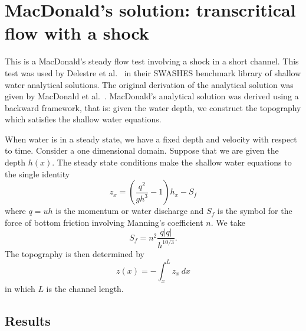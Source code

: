 
\section{MacDonald's solution: transcritical flow with a shock}

This is a MacDonald's steady flow test involving a shock in a short channel. This test was used by Delestre et al.~\cite{Delestre-etal2012} in their \textsc{SWASHES} benchmark library of shallow water analytical solutions. The original derivation of the analytical solution was given by MacDonald et al.~\cite{MBNS1995, MBNS1997}.
MacDonald's analytical solution was derived using a backward framework, that is: given the water depth, we construct the topography which satisfies the shallow water equations.

When water is in a steady state, we have a fixed depth and velocity with respect to time. Consider a one dimensional domain. Suppose that we are given the depth $h(x)$. The steady state conditions make the shallow water equations to the single identity
\begin{equation}
z_x = \left(  \frac{q^2}{gh^3} -1 \right) h_x - S_f
\end{equation}
where $q=uh$ is the momentum or water discharge and $S_f$ is the symbol for the force of bottom friction involving Manning's coefficient $n$. We take 
\begin{equation}
S_f = n^2 \frac{q|q|}{h^{10/3}}.
\end{equation}
The topography is then determined by
\begin{equation}
z(x) = -\int_{x}^{L} z_x~dx
\end{equation}
in which $L$ is the channel length.

\subsection{Results}

